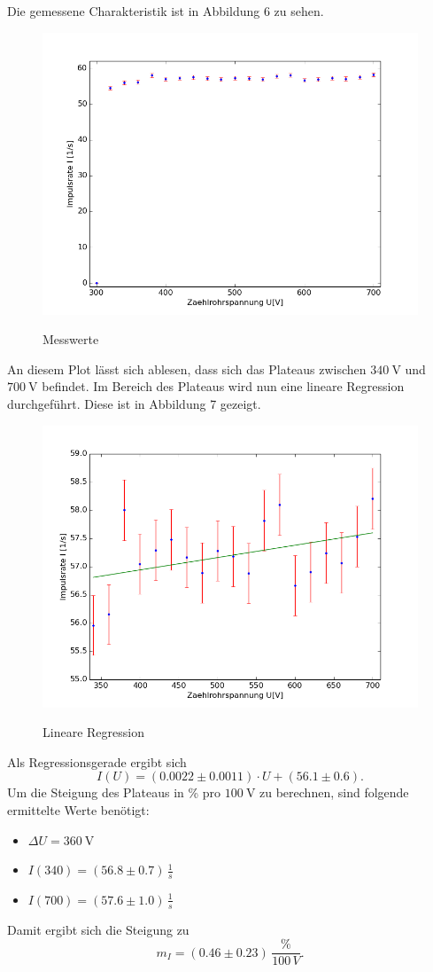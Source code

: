 \documentclass[11pt,ngerman,a4paper]{article}
\begin{document}
\noindent
Die gemessene Charakteristik ist in Abbildung 6 zu sehen.
\begin{figure}[H]
\centering
\includegraphics[scale=0.8]{plot1.png}
\label{plot1}
\caption{Messwerte}
\end{figure}
\noindent
An diesem Plot lässt sich ablesen, dass sich das Plateaus zwischen $\SI{340}{\volt}$ und $\SI{700}{\volt}$ befindet. Im Bereich des Plateaus wird nun eine lineare Regression durchgeführt. Diese ist in Abbildung 7 gezeigt.
\begin{figure}[H]
\centering
\includegraphics[scale=0.8]{plot2.png}
\label{plot2}
\caption{Lineare Regression}
\end{figure}
Als Regressionsgerade ergibt sich
\[
I(U) = (0.0022\pm0.0011) \cdot U + (56.1\pm0.6).
\]
Um die Steigung des Plateaus in \% pro $\SI{100}{\volt}$ zu berechnen, sind folgende ermittelte Werte benötigt:
\begin{itemize}
\item $\Delta U = \SI{360}{\volt}$
\item $I(340) = (56.8\pm0.7) \, \frac{1}{s}$
\item $I(700) = (57.6\pm1.0) \, \frac{1}{s}$
\end{itemize}
Damit ergibt sich die Steigung zu
\[
m_I = (0.46\pm0.23) \, \frac{\%}{100\, V}.
\]
\end{document}
